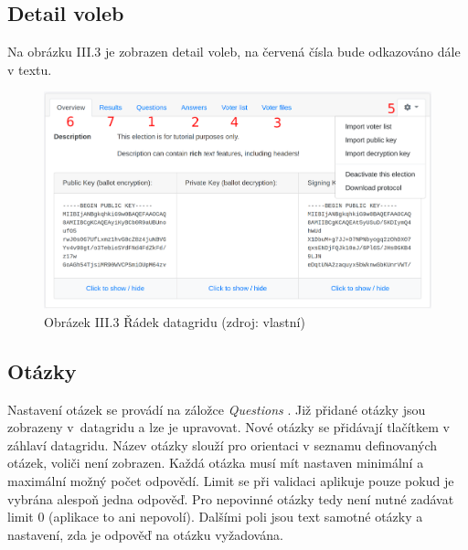 \subsection*{Detail voleb}
Na obrázku III.3 je zobrazen detail voleb, na červená čísla bude odkazováno dále v textu.
\begin{figure}[h]
	\centering
	\includegraphics[width=\linewidth]{graphics/attachements/noveVolbyDetail.png}
	\captionsetup{width=\linewidth}
	\caption*{Obrázek III.3 Řádek datagridu (zdroj: vlastní)}
\end{figure}

\subsection*{Otázky}
Nastavení otázek se provádí na záložce \textit{Questions} \;. Již přidané otázky jsou zobrazeny v~datagridu a lze je upravovat. Nové otázky se přidávají tlačítkem v záhlaví datagridu. Název otázky slouží pro orientaci v seznamu definovaných otázek, voliči není zobrazen. Každá otázka musí mít nastaven minimální a maximální možný počet odpovědí. Limit se při validaci aplikuje pouze pokud je vybrána alespoň jedna odpověď. Pro nepovinné otázky tedy není nutné zadávat limit 0 (aplikace to ani nepovolí). Dalšími poli jsou text samotné otázky a nastavení, zda je odpověď na otázku vyžadována. 

